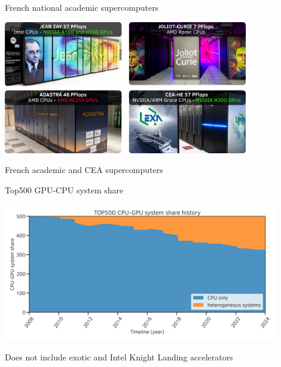 \documentclass[aspectratio=169]{beamer}
\renewcommand{\caption}[1]{%
    \begin{center}
        \scriptsize #1
    \end{center}%
}
\begin{document}
\begin{frame}{French national academic supercomputers}
    \begin{center}
    \includegraphics[width=0.8\textwidth]{french_super_computers.png}

    \caption{French academic and CEA supercomputers}
    \end{center}
\end{frame}


\begin{frame}{Top500 GPU-CPU system share}
    \begin{center}
        \includegraphics[width=0.9\textwidth]{top500_cpu_gpu_share_history.png}
    \end{center}

     Does not include exotic and Intel Knight Landing accelerators
\end{frame}

\end{document}
